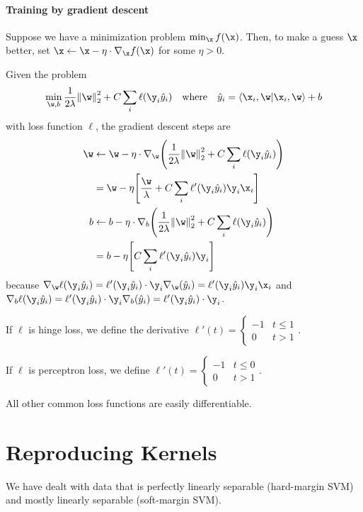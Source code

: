 \documentclass[class=cs480,notes,tikz]{agony}
\begin{document}
\paragraph{Training by gradient descent}
Suppose we have a minimization problem $\min_{\x} f(\x)$.
Then, to make a guess $\x$ better, set $\x \gets \x - \eta \cdot \nabla_{\x} f(\x)$
for some  $\eta > 0$.

Given the problem
\[
  \min_{\w,b} \frac{1}{2\lambda} \norm{\w}_2^2 + C\sum_i \ell(\y_i\hat y_i)
  \qq{where}
  \hat y_i = \ip{\x_i,\w} + b
\]
with loss function $\ell$, the gradient descent steps are
\begin{align*}
  \w & \gets \w - \eta \cdot \nabla_{\w}\qty(\frac{1}{2\lambda} \norm{\w}_2^2 + C\sum_i \ell(\y_i\hat y_i)) \\
     & = \w - \eta \qty[\frac{\w}{\lambda} + C\sum_i \ell'(\y_i\hat y_i)\y_i\x_i]                           \\
  b  & \gets b - \eta \cdot \nabla_b\qty(\frac{1}{2\lambda} \norm{\w}_2^2 + C\sum_i \ell(\y_i\hat y_i))     \\
     & = b - \eta \qty[C\sum_i \ell'(\y_i \hat y_i)\y_i]
\end{align*}
because $\nabla_{\w} \ell(\y_i\hat y_i) = \ell'(\y_i\hat y_i)\cdot\y_i\nabla_{\w}(\hat y_i) = \ell'(\y_i\hat y_i)\y_i\x_i$
and $\nabla_b \ell(\y_i\hat y_i) = \ell'(\y_i\hat y_i)\cdot\y_i \nabla_b(\hat y_i) = \ell'(\y_i\hat y_i)\cdot \y_i$.

If $\ell$ is hinge loss, we define the derivative $\ell'(t) = \begin{cases}
    -1 & t \leq 1 \\
    0  & t > 1
  \end{cases}$.

If $\ell$ is perceptron loss, we define $\ell'(t) = \begin{cases}
    -1 & t \leq 0 \\
    0  & t > 1
  \end{cases}$.

All other common loss functions are easily differentiable.

\section{Reproducing Kernels}\label{ch:kernel}
\newcommand{\phix}[1]{\mqty[\vec{#1#1\trans} \\ \sqrt{2}#1 \\ 1]}

We have dealt with data that is perfectly linearly separable (hard-margin SVM)
and mostly linearly separable (soft-margin SVM).
\end{document}
